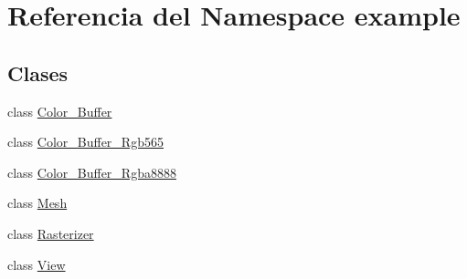 \hypertarget{namespaceexample}{}\section{Referencia del Namespace example}
\label{namespaceexample}
\subsection*{Clases}
\begin{DoxyCompactItemize}
\item 
class \mbox{\hyperlink{classexample_1_1_color___buffer}{Color\+\_\+\+Buffer}}
\item 
class \mbox{\hyperlink{classexample_1_1_color___buffer___rgb565}{Color\+\_\+\+Buffer\+\_\+\+Rgb565}}
\item 
class \mbox{\hyperlink{classexample_1_1_color___buffer___rgba8888}{Color\+\_\+\+Buffer\+\_\+\+Rgba8888}}
\item 
class \mbox{\hyperlink{classexample_1_1_mesh}{Mesh}}
\item 
class \mbox{\hyperlink{classexample_1_1_rasterizer}{Rasterizer}}
\item 
class \mbox{\hyperlink{classexample_1_1_view}{View}}
\end{DoxyCompactItemize}
